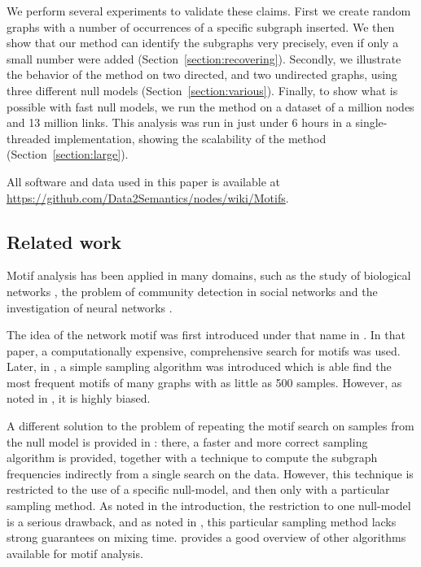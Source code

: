 We perform several experiments to validate these claims. First we create random graphs with a number of occurrences of a specific subgraph inserted. We then show that our method can identify the subgraphs very precisely, even if only a small number were added (Section~\ref{section:recovering}). Secondly, we illustrate the behavior of the method on two directed, and two undirected graphs, using three different null models (Section~\ref{section:various}). Finally, to show what is possible with fast null models, we run the method on a dataset of a million nodes and 13 million links. This analysis was run in just under 6 hours in a single-threaded implementation, showing the scalability of the method (Section~\ref{section:large}). 

All software and data used in this paper is available at \url{https://github.com/Data2Semantics/nodes/wiki/Motifs}.

\subsection{Related work}
Motif analysis has been applied in many domains, such as the study of biological networks \cite{wong2012biological}, the problem of community detection in social networks \cite{adamic2008knowledge} and the investigation of neural networks \cite{sporns2004motifs}.

The idea of the network motif was first introduced under that name in \cite{milo2002network}. In that paper, a computationally expensive, comprehensive search for motifs was used. Later, in \cite{kashtan2004efficient}, a simple sampling algorithm was introduced which is able find the most frequent motifs of many graphs with as little as 500 samples. However, as noted in \cite{wernicke2005faster}, it is highly biased.

A different solution to the problem of repeating the motif search on samples from the null model is provided in \cite{wernicke2005faster}: there, a faster and more correct sampling algorithm is provided, together with a technique to compute the subgraph frequencies indirectly from a single search on the data. However, this technique is restricted to the use of a specific null-model, and then only with a particular sampling method. As noted in the introduction, the restriction to one null-model is a serious drawback, and as noted in \cite{charo2010efficient}, this particular sampling method lacks strong guarantees on mixing time. \cite{ribeiro2009strategies} provides a good overview of other algorithms available for motif analysis.

